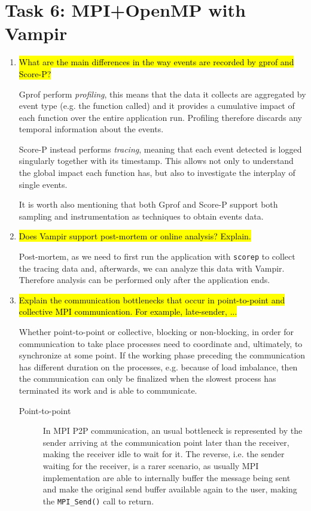 \documentclass{article}
\begin{document}
\section{Task 6: MPI+OpenMP with Vampir}
\begin{enumerate}
	\item \hl{What are the main differences in the way events are recorded by gprof and Score-P?} ~

	Gprof perform \emph{profiling}, this means that the data it collects are aggregated by event type (e.g. the function called) and it provides a cumulative impact of each function over the entire application run. Profiling therefore discards any temporal information about the events.

	Score-P instead performs \emph{tracing}, meaning that each event detected is logged singularly together with its timestamp. This allows not only to understand the global impact each function has, but also to investigate the interplay of single events.

	It is worth also mentioning that both Gprof and Score-P support both sampling and instrumentation as techniques to obtain events data.

	\item \hl{Does Vampir support post-mortem or online analysis? Explain.} ~

	Post-mortem, as we need to first run the application with \verb!scorep! to collect the tracing data and, afterwards, we can analyze this data with Vampir. Therefore analysis can be performed only after the application ends.

	\item \hl{Explain the communication bottlenecks that occur in point-to-point and collective MPI communication. For example, late-sender, ...} ~

	Whether point-to-point or collective, blocking or non-blocking, in order for communication to take place processes need to coordinate and, ultimately, to synchronize at some point. If the working phase preceding the communication has different duration on the processes, e.g. because of load imbalance, then the communication can only be finalized when the slowest process has terminated its work and is able to communicate.

	\begin{description}
		\item[Point-to-point] In MPI P2P communication, an usual bottleneck is represented by the sender arriving at the communication point later than the receiver, making the receiver idle to wait for it. The reverse, i.e. the sender waiting for the receiver, is a rarer scenario, as usually MPI implementation are able to internally buffer the message being sent and make the original send buffer available again to the user, making the \verb!MPI_Send()! call to return.


\end{description}
\end{enumerate}
\end{document}
